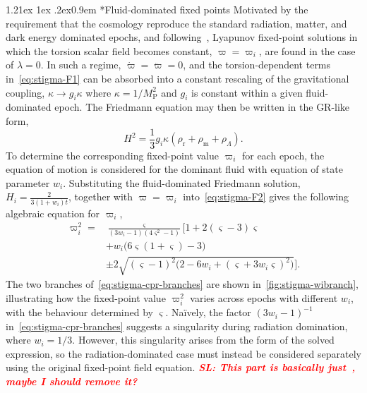 \documentclass[aps,prd,reprint,preprintnumbers,showpacs,floatfix,nofootinbib,superscriptaddress]{revtex4-2}
\makeatletter
\renewcommand{\paragraph}{%
\@startsection{paragraph}{4}%
{\z@}{1.21ex \@plus 1ex \@minus .2ex}{0.9em}%
{\normalfont\normalsize\bfseries}%
}
\newcommand{\Mp}{M_\mathrm{P}^2}
\newcommand{\cpr}{\varpi}
\newcommand{\SL}[1]{\textbf{\textit{\textcolor{red}{SL: #1}}}}
\makeatother
\begin{document}
\paragraph*{Fluid-dominated fixed points} Motivated by the requirement that the cosmology reproduce the standard radiation, matter, and dark energy dominated epochs, and following~\citep{Barker:2020gcp}, Lyapunov fixed-point solutions in which the torsion scalar field becomes constant, $\varpi=\varpi_i$, are found in the case of $\lambda = 0$. In such a regime, $\dot{\varpi}=\ddot{\varpi}=0$, and the torsion-dependent terms in~\cref{eq:stigma-F1} can be absorbed into a constant rescaling of the gravitational coupling, $\kappa \rightarrow g_i\kappa$ where $\kappa=1/\Mp$ and $g_i$ is constant within a given fluid-dominated epoch. The Friedmann equation may then be written in the GR-like form,
\begin{equation}
		H^2 = \frac{1}{3}g_i\kappa \left(\rho_\mathrm{r}+\rho_\mathrm{m}+\rho_\Lambda\right).
\end{equation}
To determine the corresponding fixed-point value $\varpi_i$ for each epoch, the equation of motion is considered for the dominant fluid with equation of state parameter $w_i$. Substituting the fluid-dominated Friedmann solution, $H_i=\tfrac{2}{3(1+w_i)t}$, together with $\varpi=\varpi_i$ into~\cref{eq:stigma-F2} gives the following algebraic equation for $\varpi_i$,
\begin{equation}
\begin{aligned}
  \cpr_i^2 = {}& \frac{\varsigma}{(3 w_i - 1)(4 \varsigma^2 - 1)}\Bigg[1+2(\varsigma-3)\varsigma \\
  & + w_i \Big(6\varsigma (1+\varsigma)-3\Big) \\
  & \pm 2 \sqrt{(\varsigma-1)^2 \Big(2 - 6 w_i + (\varsigma + 3 w_i \varsigma)^2\Big)} \Bigg].
\end{aligned}
\label{eq:stigma-cpr-branches}
\end{equation}
The two branches of~\cref{eq:stigma-cpr-branches} are shown in~\cref{fig:stigma-wibranch}, illustrating how the fixed-point value $\varpi_i^2$ varies across epochs with different $w_i$, with the behaviour determined by $\varsigma$. Na\"ively, the factor $(3w_i-1)^{-1}$ in~\cref{eq:stigma-cpr-branches} suggests a singularity during radiation domination, where $w_i=1/3$. However, this singularity arises from the form of the solved expression, so the radiation-dominated case must instead be considered separately using the original fixed-point field equation. \SL{This part is basically just~\cite{Barker:2020gcp}, maybe I should remove it?}
\end{document}
